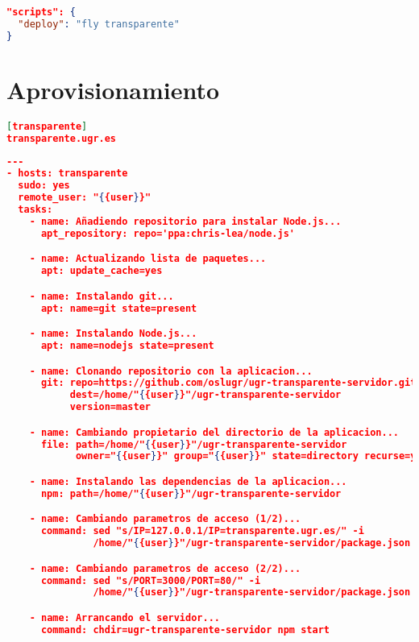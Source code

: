 \begin{lstlisting}[language=json,caption={Scripts de despliegue automático},label={lst:deploy}]
"scripts": {
  "deploy": "fly transparente"
}
\end{lstlisting}

\section{Aprovisionamiento}

\begin{lstlisting}[language=json,caption={Archivo de hosts},label={lst:hosts}]
[transparente]
transparente.ugr.es
\end{lstlisting}

\begin{lstlisting}[language=json,caption={Playbook de Ansible},label={lst:ansible}]
---
- hosts: transparente
  sudo: yes
  remote_user: "{{user}}"
  tasks:
    - name: Añadiendo repositorio para instalar Node.js...
      apt_repository: repo='ppa:chris-lea/node.js'

    - name: Actualizando lista de paquetes...
      apt: update_cache=yes

    - name: Instalando git...
      apt: name=git state=present

    - name: Instalando Node.js...
      apt: name=nodejs state=present

    - name: Clonando repositorio con la aplicacion...
      git: repo=https://github.com/oslugr/ugr-transparente-servidor.git
           dest=/home/"{{user}}"/ugr-transparente-servidor
           version=master

    - name: Cambiando propietario del directorio de la aplicacion...
      file: path=/home/"{{user}}"/ugr-transparente-servidor
            owner="{{user}}" group="{{user}}" state=directory recurse=yes

    - name: Instalando las dependencias de la aplicacion...
      npm: path=/home/"{{user}}"/ugr-transparente-servidor

    - name: Cambiando parametros de acceso (1/2)...
      command: sed "s/IP=127.0.0.1/IP=transparente.ugr.es/" -i
               /home/"{{user}}"/ugr-transparente-servidor/package.json

    - name: Cambiando parametros de acceso (2/2)...
      command: sed "s/PORT=3000/PORT=80/" -i
               /home/"{{user}}"/ugr-transparente-servidor/package.json

    - name: Arrancando el servidor...
      command: chdir=ugr-transparente-servidor npm start
\end{lstlisting}